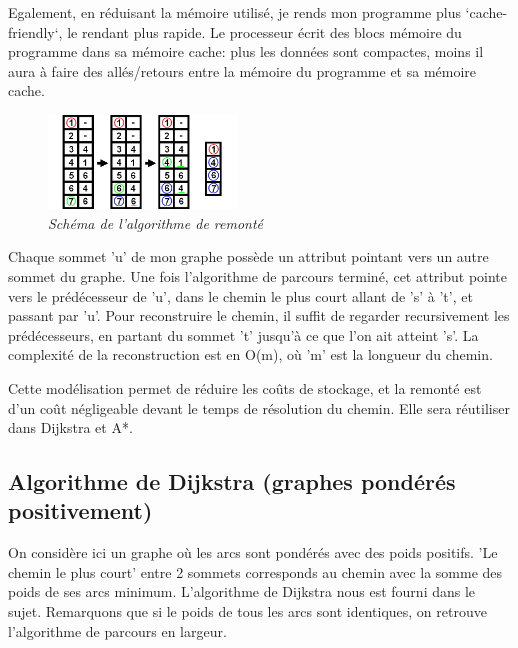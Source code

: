 \documentclass[10pt]{article}
\begin{document}
			Egalement, en réduisant la mémoire utilisé, je rends mon programme plus `cache-friendly`, le rendant plus rapide.
			Le processeur écrit des blocs mémoire du programme dans sa mémoire cache: plus les données sont compactes,
			moins il aura à faire des allés/retours entre la mémoire du programme et sa mémoire cache.\newline
							
			\begin{figure}
				\includegraphics[width=5cm]{./images/remonte.png}
				\caption{\textit{Schéma de l'algorithme de remonté}}
			\end{figure}

			Chaque sommet 'u' de mon graphe possède un attribut pointant vers un autre sommet du graphe.
			Une fois l'algorithme de parcours terminé, cet attribut pointe vers le prédécesseur de 'u',
			dans le chemin le plus court allant de 's' à 't', et passant par 'u'.
			Pour reconstruire le chemin, il suffit de regarder recursivement les prédécesseurs, en partant du sommet
			't' jusqu'à ce que l'on ait atteint 's'.
			La complexité de la reconstruction est en O(m), où 'm' est la longueur du chemin.\newline
			
			Cette modélisation permet de réduire les coûts de stockage, et la remonté est d'un coût
			négligeable devant le temps de résolution du chemin. Elle sera réutiliser dans Dijkstra et A*.
			
		\subsection{Algorithme de Dijkstra (graphes pondérés positivement)}
			On considère ici un graphe où les arcs sont pondérés avec des poids positifs.\newline
			'Le chemin le plus court' entre 2 sommets corresponds au chemin avec la somme des poids de ses arcs minimum.\newline
			L'algorithme de Dijkstra nous est fourni dans le sujet. Remarquons que si le poids de tous les arcs sont identiques,
			on retrouve l'algorithme de parcours en largeur.
\end{document}
